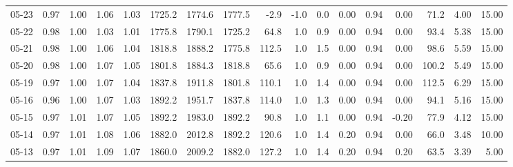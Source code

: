 \begin{threeparttable}
{\begin{tabular}{lrrrrrrrrrrrrrrrr}
  05-23 &         0.97 &           1.00 &          1.06 &          1.03 & 1725.2 & 1774.6 & 1777.5 &       -2.9 &                     -1.0 &                 0.0 &       0.00 &      0.94 &           0.00 &             71.2 &            4.00 &                  15.00 \\
  05-22 &         0.98 &           1.00 &          1.03 &          1.01 & 1775.8 & 1790.1 & 1725.2 &       64.8 &                      1.0 &                 0.9 &       0.00 &      0.94 &           0.00 &             93.4 &            5.38 &                  15.00 \\
  05-21 &         0.98 &           1.00 &          1.06 &          1.04 & 1818.8 & 1888.2 & 1775.8 &      112.5 &                      1.0 &                 1.5 &       0.00 &      0.94 &           0.00 &             98.6 &            5.59 &                  15.00 \\
  05-20 &         0.98 &           1.00 &          1.07 &          1.05 & 1801.8 & 1884.3 & 1818.8 &       65.6 &                      1.0 &                 0.9 &       0.00 &      0.94 &           0.00 &            100.2 &            5.49 &                  15.00 \\
  05-19 &         0.97 &           1.00 &          1.07 &          1.04 & 1837.8 & 1911.8 & 1801.8 &      110.1 &                      1.0 &                 1.4 &       0.00 &      0.94 &           0.00 &            112.5 &            6.29 &                  15.00 \\
  05-16 &         0.96 &           1.00 &          1.07 &          1.03 & 1892.2 & 1951.7 & 1837.8 &      114.0 &                      1.0 &                 1.3 &       0.00 &      0.94 &           0.00 &             94.1 &            5.16 &                  15.00 \\
  05-15 &         0.97 &           1.01 &          1.07 &          1.05 & 1892.2 & 1983.0 & 1892.2 &       90.8 &                      1.0 &                 1.1 &       0.00 &      0.94 &          -0.20 &             77.9 &            4.12 &                  15.00 \\
  05-14 &         0.97 &           1.01 &          1.08 &          1.06 & 1882.0 & 2012.8 & 1892.2 &      120.6 &                      1.0 &                 1.4 &       0.20 &      0.94 &           0.00 &             66.0 &            3.48 &                  10.00 \\
  05-13 &         0.97 &           1.01 &          1.09 &          1.07 & 1860.0 & 2009.2 & 1882.0 &      127.2 &                      1.0 &                 1.4 &       0.20 &      0.94 &           0.20 &             63.5 &            3.39 &                   5.00 \\

\end{tabular}}
\end{threeparttable}
